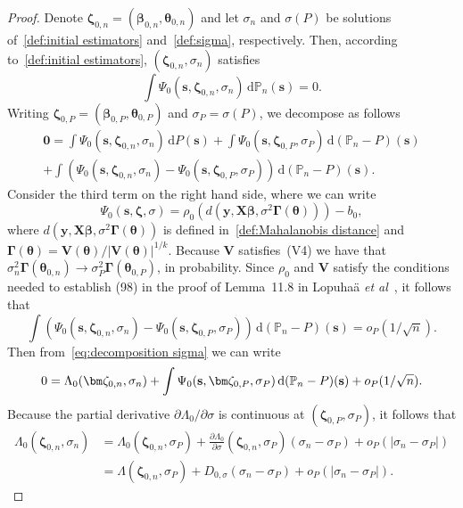 \documentclass{article}
\numberwithin{equation}{section}
\theoremstyle{plain}
\newcommand{\dd}{\mathrm{d}}
\newcommand{\bbeta}{\bm\beta}
\newcommand{\btheta}{\bm\theta}
\newcommand{\bGamma}{\bm\Gamma}
\newcommand{\bzeta}{\bm\zeta}
\newcommand{\by}{\mathbf{y}}
\newcommand{\bs}{\mathbf{s}}
\newcommand{\bX}{\mathbf{X}}
\newcommand{\bV}{\mathbf{V}}
\begin{document}
\begin{proof}
Denote $\bzeta_{0,n}=(\bbeta_{0,n},\btheta_{0,n})$ and 
let $\sigma_n$ and $\sigma(P)$ be solutions of~\eqref{def:initial estimators} and~\eqref{def:sigma}, respectively.
Then, according to~\eqref{def:initial estimators}, $(\bzeta_{0,n},\sigma_n)$ satisfies 
\[
\int \Psi_0(\bs,\bzeta_{0,n},\sigma_n)\,\dd \mathbb{P}_n(\bs)=0.
\]
Writing $\bzeta_{0,P}=(\bbeta_{0,P},\btheta_{0,P})$ and $\sigma_P=\sigma(P)$, we decompose as follows
\begin{equation}
\label{eq:decomposition sigma}
\begin{split}
\mathbf{0}
=
\int \Psi_0(\mathbf{s},\bzeta_{0,n},\sigma_n)\,\dd P(\mathbf{s})
+
\int \Psi_0(\mathbf{s},\bzeta_{0,P},\sigma_P)\,\dd (\mathbb{P}_n-P)(\mathbf{s})\\
+
\int
\left(
\Psi_0(\mathbf{s},\bzeta_{0,n},\sigma_n)-\Psi_0(\mathbf{s},\bzeta_{0,P},\sigma_P)
\right)
\,\dd (\mathbb{P}_n-P)(\mathbf{s}).
\end{split}
\end{equation}
Consider the third term on the right hand side, where we can write
\[
\Psi_0(\bs,\bzeta,\sigma)
=
\rho_0
\left(
d(\by,\bX\bbeta,\sigma^2\bGamma(\btheta))
\right)
-
b_0,
\]
where $d(\by,\bX\bbeta,\sigma^2\bGamma(\btheta))$ is defined in~\eqref{def:Mahalanobis distance}
and $\bGamma(\btheta)=\bV(\btheta)/|\bV(\btheta)|^{1/k}$.
Because $\bV$ satisfies~(V4) we have that $\sigma_n^2\bGamma(\btheta_{0,n})\to\sigma_P^2\bGamma(\btheta_{0,P})$, in probability.
Since $\rho_0$ and $\bV$ satisfy the conditions needed to establish (98) in the proof of 
Lemma~11.8 in Lopuha\"a \textit{et al}~\cite{supplement}, it follows that
\[
\int
\left(
\Psi_0(\mathbf{s},\bzeta_{0,n},\sigma_n)-\Psi_0(\mathbf{s},\bzeta_{0,P},\sigma_P)
\right)
\,\dd (\mathbb{P}_n-P)(\mathbf{s})
=
o_P(1/\sqrt{n}).
\]
Then from~\eqref{eq:decomposition sigma} we can write
\[
0
=
\Lambda_0(\bzeta_{0,n},\sigma_n)
+
\int \Psi_0(\mathbf{s},\bzeta_{0,P},\sigma_P)\,\dd (\mathbb{P}_n-P)(\mathbf{s})\\
+
o_P(1/\sqrt{n}).
\]
Because the partial derivative $\partial\Lambda_0/\partial\sigma$  is continuous at
$(\bzeta_{0,P},\sigma_P)$, it follows that
\[
\begin{split}
\Lambda_0(\bzeta_{0,n},\sigma_n)
&=
\Lambda_0(\bzeta_{0,n},\sigma_P)
+
\frac{\partial\Lambda_0}{\partial\sigma}(\bzeta_{0,n},\sigma_P)
(\sigma_n-\sigma_P)+
o_P(|\sigma_n-\sigma_P|)\\
&=
\Lambda(\bzeta_{0,n},\sigma_P)
+
D_{0,\sigma}
(\sigma_n-\sigma_P)+
o_P(|\sigma_n-\sigma_P|).

\end{split}\]
\end{proof}
\end{document}

